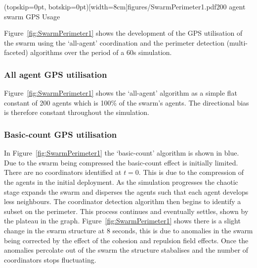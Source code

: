 \documentclass{ieeeaccess}
\begin{document}

\Figure[t!](topskip=0pt, botskip=0pt)[width=8cm]{figures/SwarmPerimeter1.pdf}{200 agent swarm GPS Usage\label{fig:SwarmPerimeter1}}

Figure~\ref{fig:SwarmPerimeter1} shows the development of the GPS utilisation of the swarm using the `all-agent' coordination and the perimeter detection (multi-faceted) algorithms over the period of a 60s simulation. 

\subsubsection{All agent GPS utilisation\label{section:SwarmPerimeter2}}
Figure~\ref{fig:SwarmPerimeter1} shows the `all-agent' algorithm as a simple flat constant of 200 agents which is 100\% of the swarm's agents. The directional bias is therefore constant throughout the simulation. 

\subsubsection{Basic-count GPS utilisation\label{section:SwarmPerimeter3}}
In Figure~\ref{fig:SwarmPerimeter1} the `basic-count' algorithm is shown in blue. Due to the swarm being compressed the basic-count effect is initially limited. There are no coordinators identified at $t=0$. This is due to the compression of the agents in the initial deployment. As the simulation progresses the chaotic stage expands the swarm and disperses the agents such that each agent develops less neighbours. The coordinator detection algorithm then begins to identify a subset on the perimeter. This process continues and eventually settles, shown by the plateau in the graph. Figure~\ref{fig:SwarmPerimeter1} shows there is a slight change in the swarm structure at 8 seconds, this is due to anomalies in the swarm being corrected by the effect of the cohesion and repulsion field effects. Once the anomalies percolate out of the swarm the structure stabalises and the number of coordinators stops fluctuating.
\end{document}

